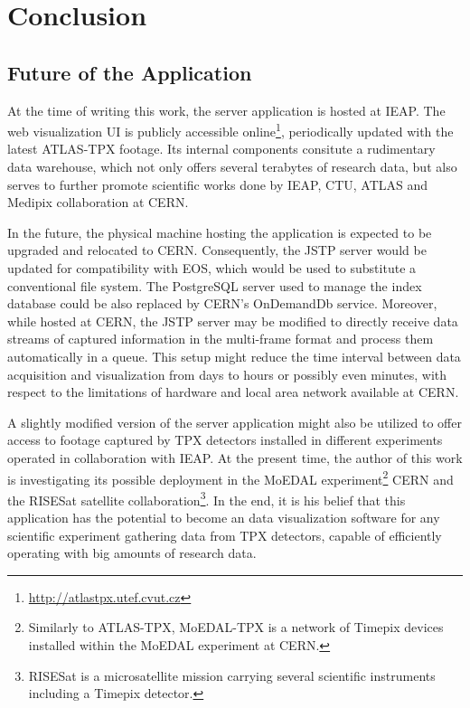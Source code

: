 \chapter{Conclusion}

\section{Future of the Application}
At the time of writing this work, the server application is hosted at IEAP. The web visualization UI is publicly accessible online\footnote{\url{http://atlastpx.utef.cvut.cz}}, periodically updated with the latest ATLAS-TPX footage. Its internal components consitute a rudimentary data warehouse, which not only offers several terabytes of research data, but also serves to further promote scientific works done by IEAP, CTU, ATLAS and Medipix collaboration at CERN.

In the future, the physical machine hosting the application is expected to be upgraded and relocated to CERN. Consequently, the JSTP server would be updated for compatibility with EOS, which would be used to substitute a conventional file system. The PostgreSQL server used to manage the index database could be also replaced by CERN's OnDemandDb service. Moreover, while hosted at CERN, the JSTP server may be modified to directly receive data streams of captured information in the multi-frame format and process them automatically in a queue. This setup might reduce the time interval between data acquisition and visualization from days to hours or possibly even minutes, with respect to the limitations of hardware and local area network available at CERN.

A slightly modified version of the server application might also be utilized to offer access to footage captured by TPX detectors installed in different experiments operated in collaboration with IEAP. At the present time, the author of this work is investigating its possible deployment in the MoEDAL experiment\footnote{Similarly to ATLAS-TPX, MoEDAL-TPX is a network of Timepix devices installed within the MoEDAL experiment at CERN.} CERN and the RISESat satellite collaboration\footnote{RISESat is a microsatellite mission carrying several scientific instruments including a Timepix detector.}. In the end, it is his belief that this application has the potential to become an data visualization software for any scientific experiment gathering data from TPX detectors, capable of efficiently operating with big amounts of research data.
